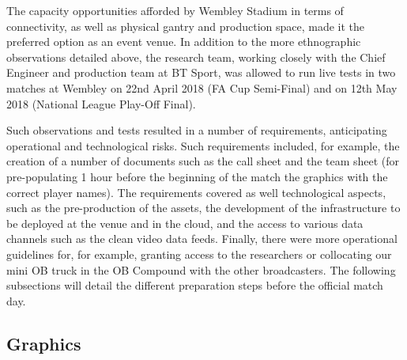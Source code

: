 \documentclass[sigchi-a, authorversion]{acmart}
\begin{document}
The capacity opportunities afforded by Wembley Stadium in terms of connectivity, as well as physical gantry and production space, made it the preferred option as an event venue. In addition to the more ethnographic observations detailed above, the research team, working closely with the Chief Engineer and production team at BT Sport, was allowed to run live tests in two matches at Wembley on 22nd April 2018 (FA Cup Semi-Final) and on 12th May 2018 (National League Play-Off Final).

Such observations and tests resulted in a number of requirements, anticipating operational and technological risks. Such requirements included, for example, the creation of a number of documents such as the call sheet and the team sheet (for pre-populating 1 hour before the beginning of the match the graphics with the correct player names). The requirements covered as well technological aspects, such as the pre-production of the assets, the development of the infrastructure to be deployed at the venue and in the cloud, and the access to various data channels such as the clean video data feeds. Finally, there were more operational guidelines for, for example, granting access to the researchers or collocating our mini OB truck in the OB Compound with the other broadcasters. The following subsections will detail the different preparation steps before the official match day.


\subsection{Graphics}
\end{document}
